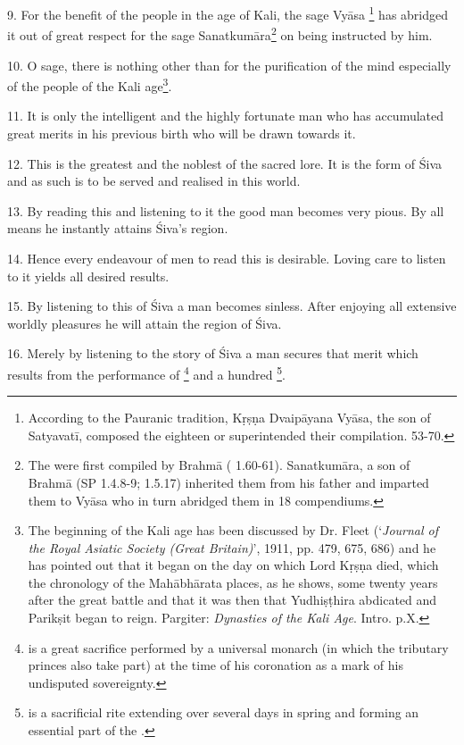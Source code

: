 9. For the benefit of the people in the age of Kali, the sage Vyāsa
\footnote{According to the Pauranic tradition, Kṛṣṇa Dvaipāyana Vyāsa, the son
of Satyavatī, composed the eighteen  or superintended their
compilation.  53-70.} has abridged it out of great respect for
the sage Sanatkumāra\footnote{The  were first compiled by Brahmā
( 1.60-61). Sanatkumāra, a son of Brahmā (SP 1.4.8-9; 1.5.17)
inherited them from his father and imparted them to Vyāsa who in turn abridged
them in 18 compendiums.} on being instructed by him.

10. O sage, there is nothing other than  for the purification of
the mind especially of the people of the Kali age\footnote{The beginning of
the Kali age has been discussed by Dr. Fleet (‘\emph{Journal of the Royal
Asiatic Society (Great Britain)}’, 1911, pp. 479, 675, 686) and he has pointed
out that it began on the day on which Lord Kṛṣṇa died, which the chronology of
the Mahābhārata places, as he shows, some twenty years after the great battle
and that it was then that Yudhiṣṭhira abdicated and Parikṣit began to reign.
Pargiter: \emph{Dynasties of the Kali Age}. Intro. p.X.}.

11. It is only the intelligent and the highly fortunate man who has accumulated
great merits in his previous birth who will be drawn towards it.

12. This  is the greatest and the noblest of the sacred lore. It
is the form of Śiva and as such is to be served and realised in this world.

13. By reading this and listening to it the good man becomes very pious. By all
means he instantly attains Śiva’s region.

14. Hence every endeavour of men to read this is desirable. Loving care to
listen to it yields all desired results.

15. By listening to this  of Śiva a man becomes sinless. After
enjoying all extensive worldly pleasures he will attain the region of Śiva.

16. Merely by listening to the story of Śiva a man secures that merit which
results from the performance of \footnote{ is a great
sacrifice performed by a universal monarch (in which the tributary princes also
take part) at the time of his coronation as a mark of his undisputed
sovereignty.} and a hundred \footnote{ is a
sacrificial rite extending over several days in spring and forming an essential
part of the .}.

